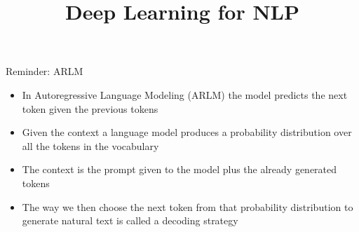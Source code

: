 \documentclass[11pt,compress,t,notes=noshow, xcolor=table]{beamer}
\title{Deep Learning for NLP}
\begin{document}


\begin{frame}{Reminder: ARLM}

\vfill

\begin{itemize}
    \item In Autoregressive Language Modeling (ARLM) the model predicts the next token given the previous tokens
    \item Given the context a language model produces a probability distribution over all the tokens in the vocabulary
    \item The context is the prompt given to the model plus the already generated tokens
    \item The way we then choose the next token from that probability distribution to generate natural text is called a decoding strategy
\end{itemize}

\vfill
    
\end{frame}

\end{document}
